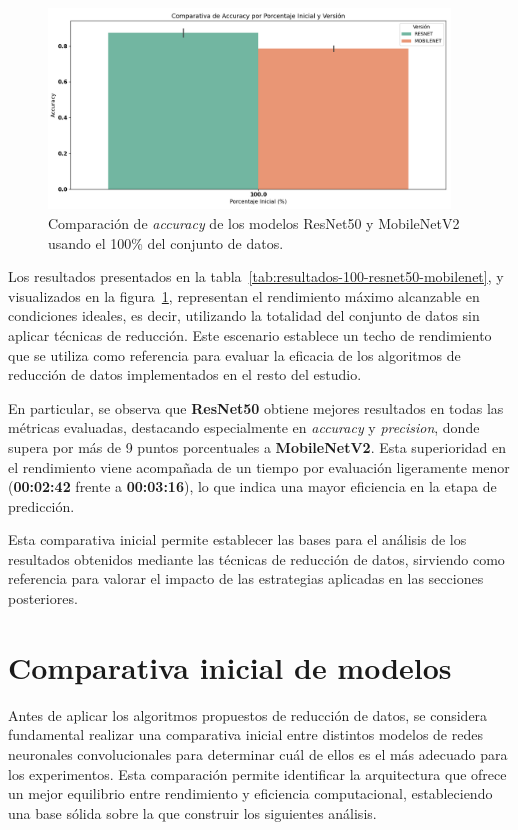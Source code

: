 \begin{figure}[htp]
    \centering
    \includegraphics[width=0.95\textwidth]{imagenes/evaluaciones/comparacion_modelos_100}
    \caption{Comparación de \textit{accuracy} de los modelos ResNet50 y MobileNetV2 usando el 100\% del conjunto de datos.}
    \label{fig:comparacion_modelos_100}
\end{figure}

Los resultados presentados en la tabla~\ref{tab:resultados-100-resnet50-mobilenet}, y visualizados en la figura~\ref{fig:comparacion_modelos_100},
representan el rendimiento máximo alcanzable en condiciones ideales,
es decir, utilizando la totalidad del conjunto de datos sin aplicar técnicas de reducción.
Este escenario establece un techo de rendimiento que se utiliza como referencia para evaluar la eficacia de
los algoritmos de reducción de datos implementados en el resto del estudio.

En particular, se observa que \textbf{ResNet50} obtiene mejores resultados en todas las métricas evaluadas,
destacando especialmente en \textit{accuracy} y \textit{precision}, donde supera por más de 9 puntos porcentuales a \textbf{MobileNetV2}.
Esta superioridad en el rendimiento viene acompañada de un tiempo por evaluación ligeramente menor (\textbf{00:02:42} frente a \textbf{00:03:16}),
lo que indica una mayor eficiencia en la etapa de predicción.

Esta comparativa inicial permite establecer las bases para el análisis de los resultados obtenidos mediante las técnicas de reducción de datos,
sirviendo como referencia para valorar el impacto de las estrategias aplicadas en las secciones posteriores.


\section{Comparativa inicial de modelos}\label{sec:comparativa-inicial-modelos}
Antes de aplicar los algoritmos propuestos de reducción de datos, se considera fundamental realizar una comparativa inicial entre distintos
modelos de redes neuronales convolucionales para determinar cuál de ellos es el más adecuado para los experimentos.
Esta comparación permite identificar la arquitectura que ofrece un mejor equilibrio entre rendimiento y eficiencia computacional,
estableciendo una base sólida sobre la que construir los siguientes análisis.


